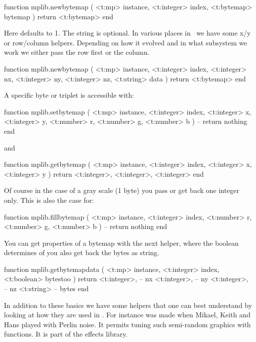 \starttyping[option=LUA]
function mplib.newbytemap (
    <t:mp>      instance,
    <t:integer> index,
    <t:bytemap> bytemap
)
    return <t:bytemap>
end
\stoptyping

Here  defaults to 1. The  string is optional. In various
places in \LUAMETATEX\ we have some x/y or row/column helpers. Depending on how
it evolved and in what subsystem we work we either pass the row first or the
column.

\starttyping[option=LUA]
function mplib.newbytemap (
    <t:mp>      instance,
    <t:integer> index,
    <t:integer> nx,
    <t:integer> ny,
    <t:integer> nz,
    <t:string>  data
)
    return <t:bytemap>
end
\stoptyping

A specific byte or triplet is accessible with:

\starttyping[option=LUA]
function mplib.setbytemap (
    <t:mp>      instance,
    <t:integer> index,
    <t:integer> x,
    <t:integer> y,
    <t:number>  r,
    <t:number>  g,
    <t:number>  b
)
    -- return nothing
end
\stoptyping

and

\starttyping[option=LUA]
function mplib.getbytemap (
    <t:mp>      instance,
    <t:integer> index,
    <t:integer> x,
    <t:integer> y
)
    return
        <t:integer>, <t:integer>, <t:integer>
end
\stoptyping

Of course in the case of a gray scale (1 byte) you pass or get back one integer
only. This is also the case for:

\starttyping[option=LUA]
function mplib.fillbytemap (
    <t:mp>      instance,
    <t:integer> index,
    <t:number>  r,
    <t:number>  g,
    <t:number>  b
)
    -- return nothing
end
\stoptyping

You can get properties of a bytemap with the next helper, where the boolean
determines of you also get back the bytes as string.

\starttyping[option=LUA]
function mplib.getbytemapdata (
    <t:mp>      instance,
    <t:integer> index,
    <t:boolean> bytestoo
)
    return
        <t:integer>, -- nx
        <t:integer>, -- ny
        <t:integer>, -- nz
        <t:string>   -- bytes
end
\stoptyping

In addition to these basics we have some helpers that one can best understand by
looking at how they are used in \CONTEXT. For instance 
was made when Mikael, Keith and Hans played with Perlin noise. It permits tuning
such semi-random graphics with functions. It is part of the effects library.

